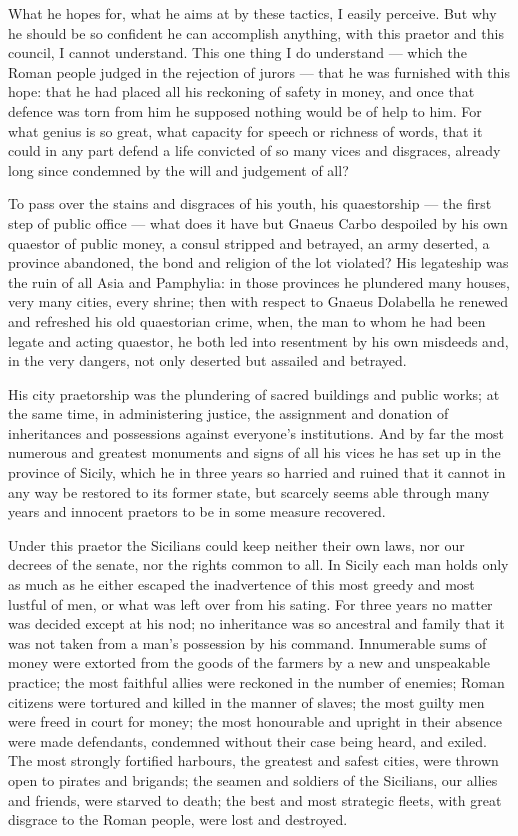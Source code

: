  What he hopes for, what he aims at by these tactics, I easily perceive. But why he should be so confident he can accomplish anything, with this praetor and this council, I cannot understand. This one thing I do understand --- which the Roman people judged in the rejection of jurors --- that he was furnished with this hope: that he had placed all his reckoning of safety in money, and once that defence was torn from him he supposed nothing would be of help to him. For what genius is so great, what capacity for speech or richness of words, that it could in any part defend a life convicted of so many vices and disgraces, already long since condemned by the will and judgement of all?

 To pass over the stains and disgraces of his youth, his quaestorship --- the first step of public office --- what does it have but Gnaeus Carbo despoiled by his own quaestor of public money, a consul stripped and betrayed, an army deserted, a province abandoned, the bond and religion of the lot violated? His legateship was the ruin of all Asia and Pamphylia: in those provinces he plundered many houses, very many cities, every shrine; then with respect to Gnaeus Dolabella he renewed and refreshed his old quaestorian crime, when, the man to whom he had been legate and acting quaestor, he both led into resentment by his own misdeeds and, in the very dangers, not only deserted but assailed and betrayed.

 His city praetorship was the plundering of sacred buildings and public works; at the same time, in administering justice, the assignment and donation of inheritances and possessions against everyone's institutions. And by far the most numerous and greatest monuments and signs of all his vices he has set up in the province of Sicily, which he in three years so harried and ruined that it cannot in any way be restored to its former state, but scarcely seems able through many years and innocent praetors to be in some measure recovered.

 Under this praetor the Sicilians could keep neither their own laws, nor our decrees of the senate, nor the rights common to all. In Sicily each man holds only as much as he either escaped the inadvertence of this most greedy and most lustful of men, or what was left over from his sating. For three years no matter was decided except at his nod; no inheritance was so ancestral and family that it was not taken from a man's possession by his command. Innumerable sums of money were extorted from the goods of the farmers by a new and unspeakable practice; the most faithful allies were reckoned in the number of enemies; Roman citizens were tortured and killed in the manner of slaves; the most guilty men were freed in court for money; the most honourable and upright in their absence were made defendants, condemned without their case being heard, and exiled. The most strongly fortified harbours, the greatest and safest cities, were thrown open to pirates and brigands; the seamen and soldiers of the Sicilians, our allies and friends, were starved to death; the best and most strategic fleets, with great disgrace to the Roman people, were lost and destroyed.

